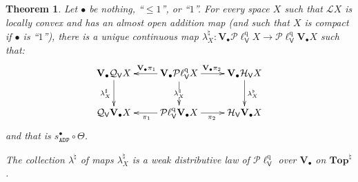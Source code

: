 \documentclass[preprint,12pt]{elsarticle}
\newcommand\Lform{\mathcal L}
\newcommand\Angel{{\mathtt{A}}}
\newcommand\Demon{{\mathtt{D}}}
\newcommand\Nature{{\mathtt{P}}}
\newcommand\ADN{{\Angel\Demon\Nature}}
\newcommand\Smyth{{\mathcal Q}}
\newcommand\Hoare{{\mathcal H}}
\newcommand\Vt{\mathsf{V}}
\newcommand\HV{\Hoare_\Vt}
\newcommand\SV{\Smyth_{\Vt}}
\newcommand\quasi{\mathrm{q}} %
\newcommand\QL{\Plotkin^\quasi}
\newcommand\QLV{\QL_\Vt}
\newcommand\Plotkin{\mathcal P\ell} %
\newcommand\Val{{\mathbf V}}
\newcommand\Topcat{\mathbf{Top}}
\newtheorem{theorem}{Theorem}[section]
\begin{document}
\begin{theorem}
  \label{thm:lambda:nat}
  Let $\bullet$ be nothing, ``$\leq 1$'', or ``$1$''.  For every space
  $X$ such that $\Lform X$ is locally convex and has an almost open
  addition map (and such that $X$ is compact if $\bullet$ is ``$1$''),
  there is a unique continuous map
  $\lambda^\natural_X \colon \Val_\bullet {\QLV X} \to \QLV
  {\Val_\bullet X}$ such that:
  \begin{equation}
    \label{eq:lambda:nat}
    \xymatrix{
      \Val_\bullet {\SV X}
      \ar[d]_{\lambda^\sharp_X}
      & \Val_\bullet {\QLV X}
      \ar[l]_{\Val_\bullet {\pi_1}}
      \ar[d]|{\lambda^\natural_X}
      \ar[r]^{\Val_\bullet {\pi_2}}
      & \Val_\bullet {\HV X}
      \ar[d]^{\lambda^\flat_X}
      \\
      \SV {\Val_\bullet X}
      & \QLV {\Val_\bullet X}
      \ar[l]^{\pi_1}
      \ar[r]_{\pi_2}
      & \HV {\Val_\bullet X}
      }
    \end{equation}
    and that is $s_\ADN^\bullet \circ \Theta$.

    The collection $\lambda^\natural$ of maps $\lambda^\natural_X$ is
    a weak distributive law of $\QLV$ over $\Val_\bullet$ on
    $\Topcat^\natural$.
\end{theorem}
\end{document}
